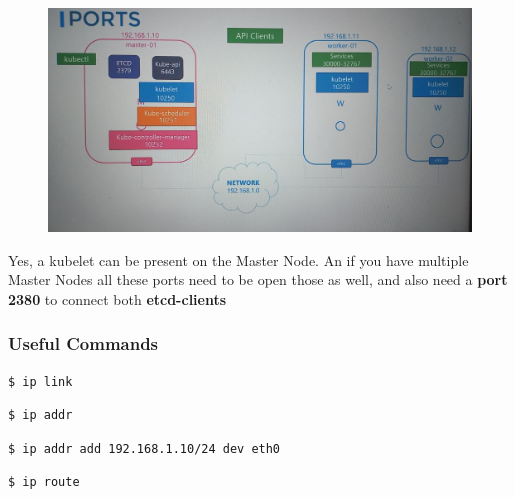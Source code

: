 \documentclass{article}
\newenvironment{blocktemplate}[1]{%
    \tcolorbox[beamer,%
    noparskip,breakable,
    colframe=Blue,%
    colbacklower=LimeGreen!75!LightGreen,%
    title=#1]}%
    {\endtcolorbox}
\newenvironment{codetemplate}[1][]{%
  \mybasecolorbox[#1]
  \itshape
}{%
  \endmybasecolorbox
}
\begin{document}
\begin{figure}[H]
    \includegraphics[width=\textwidth]{pictures/ports.png}
\end{figure}

\begin{blocktemplate}{NOTE}
Yes, a kubelet can be present on the Master Node. An if you have multiple Master Nodes all these ports need to be open those as well, and also need a \textbf{port 2380} to connect both \textbf{etcd-clients}
\end{blocktemplate}

\subsubsection{Useful Commands}

\begin{codetemplate}{}
\begin{verbatim}
$ ip link
\end{verbatim}
\end{codetemplate}

\begin{codetemplate}{}
\begin{verbatim}
$ ip addr
\end{verbatim}
\end{codetemplate}

\begin{codetemplate}{}
\begin{verbatim}
$ ip addr add 192.168.1.10/24 dev eth0
\end{verbatim}
\end{codetemplate}

\begin{codetemplate}{}
\begin{verbatim}
$ ip route
\end{verbatim}
\end{codetemplate}
\end{document}
